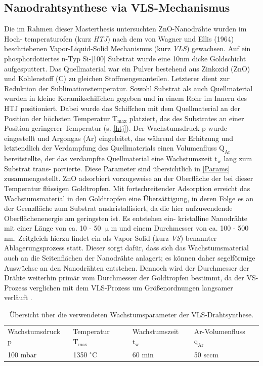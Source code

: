 \subsection{Nanodrahtsynthese via VLS-Mechanismus}
Die im Rahmen dieser Masterthesis untersuchten ZnO-Nanodrähte wurden im Hoch- temperaturofen (kurz \textit{HTJ}) nach dem von Wagner und Ellis (1964) beschriebenen Vapor-Liquid-Solid Mechanismus (kurz \textit{VLS}) \cite{Wagner.1964} gewachsen. Auf ein phosphordotiertes n-Typ Si-[100] Substrat wurde eine 10nm dicke Goldschicht aufgesputtert. Das Quellmaterial war ein Pulver bestehend aus Zinkoxid (ZnO) und Kohlenstoff (C) zu gleichen Stoffmengenanteilen. Letzterer dient zur Reduktion der Sublimationstemperatur. Sowohl Substrat als auch Quellmaterial wurden in kleine Keramikschiffchen gegeben und in einem Rohr im Innern des HTJ positioniert. Dabei wurde das Schiffchen mit dem Quellmaterial an der Position der höchsten Temperatur $\text{T}_\text{max}$ platziert, das des Substrates an einer Position geringerer Temperatur (s. \autoref{htj}). Der Wachstumsdruck p wurde eingestellt und Argongas (Ar) eingeleitet, das während der Erhitzung und letztendlich der Verdampfung des Quellmaterials einen Volumenfluss $\text{Q}_\text{Ar}$ bereitstellte, der das verdampfte Quellmaterial eine Wachstumszeit $\text{t}_\text{w}$ lang zum Substrat trans- portierte. Diese Parameter sind übersichtlich in \autoref{Params} zusammengestellt. 
ZnO adsorbiert vorzugsweise an der Oberfläche der bei dieser Temperatur flüssigen Goldtropfen. Mit fortschreitender Adsorption erreicht das Wachstumsmaterial in den Goldtropfen eine Übersättigung, in deren Folge es an der Grenzfläche zum Substrat auskristallisiert, da die hier aufzuwendende Oberflächenenergie am geringsten ist. Es entstehen ein- kristalline Nanodrähte mit einer Länge von ca. 10 - 50 $\upmu$m und einem Durchmesser von ca. 100 - 500 nm. Zeitgleich hierzu findet ein als Vapor-Solid (kurz \textit{VS}) benannter Ablagerungsprozess statt. Dieser sorgt dafür, dass sich das Wachstumsmaterial auch an die Seitenflächen der Nanodrähte anlagert; es können daher segelförmige Auswüchse an den Nanodrähten entstehen. Dennoch wird der Durchmesser der Drähte weiterhin primär vom Durchmesser der Goldtropfen bestimmt, da der VS-Prozess verglichen mit dem VLS-Prozess um Größenordnungen langsamer verläuft \cite{Geburt.Diss}. 
\begin{table}
\begin{tabular}{llll}
Wachstumsdruck p & Temperatur $\text{T}_\text{max}$ & Wachstumszeit $\text{t}_\text{w}$ & Ar-Volumenfluss $\text{q}_\text{Ar}$ \\ 
100 mbar & 1350 $^{\circ}$C & 60 min & 50 sccm \\ 
\end{tabular}
\caption[VLS-Wachstumsparameter]{Übersicht über die verwendeten Wachstumsparameter der VLS-Drahtsynthese.}
\label{Params} 
\end{table}
